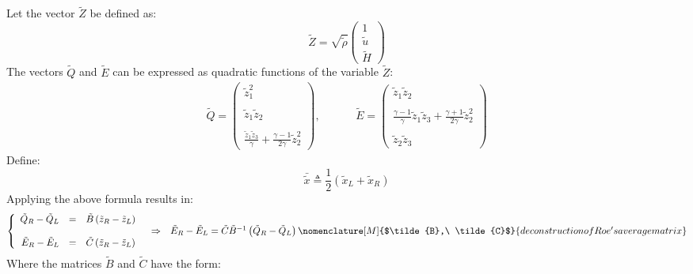 \documentclass[11pt, a4paper]{article}
\begin{document}
Let the vector $\tilde{Z}$ be defined as:
\begin{equation*}
    \tilde{Z}=\sqrt{\tilde{\rho}}\begin{pmatrix}
        1 \\
        \tilde{u} \\
        \tilde{H}
    \end{pmatrix}
\end{equation*}
The vectors $\tilde{Q}$ and $\tilde{E}$ can be expressed as quadratic functions of the variable $\tilde{Z}$:
\begin{equation}
    \begin{matrix}
        \tilde{Q}=\begin{pmatrix}
            \tilde{z}_1^2 \\\\
            \tilde{z}_1\tilde{z}_2 \\\\
            \displaystyle\frac{\tilde{z}_1\tilde{z}_3}{\gamma}+\frac{\gamma-1}{2\gamma}\tilde{z}_2^2
        \end{pmatrix},\hspace{1cm} & \tilde{E}=\begin{pmatrix}
            \tilde{z}_1\tilde{z}_2 \\\\
            \displaystyle\frac{\gamma-1}{\gamma}\tilde{z}_1\tilde{z}_3+\frac{\gamma+1}{2\gamma}\tilde{z}_2^2 \\\\
            \tilde{z}_2\tilde{z}_3
        \end{pmatrix}
    \end{matrix}
\end{equation}
Define:
\begin{equation}
    \bar{\tilde{x}}\triangleq\frac{1}{2}\left(\tilde{x}_L+\tilde{x}_R\right)
\end{equation}
Applying the above formula results in:
\begin{equation}
    \begin{matrix}
        \left\{\begin{array}{rcl}
            \tilde{Q}_R-\tilde{Q}_L & = & \tilde{B}\left(\tilde{z}_R-\tilde{z}_L\right) \\\\
            \tilde{E}_R-\tilde{E}_L & = & \tilde{C}\left(\tilde{z}_R-\tilde{z}_L\right)
        \end{array}\right. & \Rightarrow & \tilde{E}_R-\tilde{E}_L=\tilde{C}\tilde{B}^{-1}\left(\tilde{Q}_R-\tilde{Q}_L\right)
        \nomenclature[M]{$\tilde{B},\ \tilde{C}$}{deconstruction of Roe's average matrix}
    \end{matrix}
\end{equation}
Where the matrices $\tilde{B}$ and $\tilde{C}$ have the form:
\begin{equation}
    \begin{matrix}
        
    \end{matrix}
\end{equation}
\end{document}
